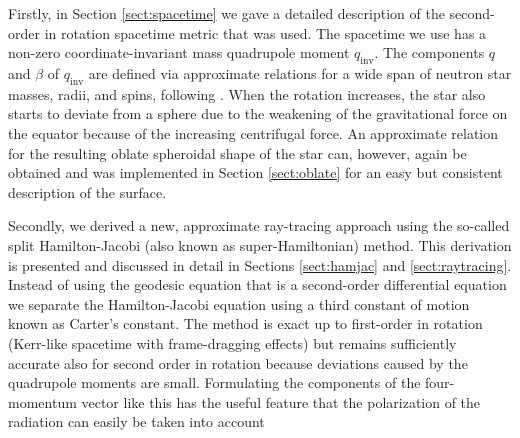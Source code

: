 \documentclass{aa}
\newcommand{\refe}[1]{#1}
\newcommand{\qinv}{\ensuremath{q_{\mathrm{inv}}}}
\begin{document}
Firstly, in Section \ref{sect:spacetime} we gave a detailed description of the second-order in rotation spacetime metric that was used.
The spacetime we use has a non-zero coordinate-invariant mass quadrupole moment $\qinv$. 
\refe{The components $q$ and $\beta$ of $\qinv$ are defined via approximate relations for a wide span of neutron star masses, radii, and spins, following \citet{aGM14}.}
When the rotation increases, the star also starts to deviate from a sphere due to the weakening of the gravitational force on the equator because of the increasing centrifugal force.
An \refe{approximate} relation for the resulting oblate spheroidal shape of the star can, however, again be obtained \citep{MLC07, aGM14} and was implemented in Section \ref{sect:oblate} for an easy but consistent description of the surface.

Secondly, we derived a new, \refe{approximate} ray-tracing \refe{approach} using the so-called split Hamilton-Jacobi (also known as super-Hamiltonian) method.
This derivation is presented and discussed in detail in Sections \ref{sect:hamjac} and \ref{sect:raytracing}.
Instead of using the geodesic equation that is a second-order differential equation we separate the Hamilton-Jacobi equation using a third constant of motion known as Carter's constant.
The method is exact up to first-order in rotation (Kerr-like spacetime with frame-dragging effects) but remains sufficiently accurate also for second order in rotation because deviations caused by the quadrupole moments are small.
Formulating the components of the four-momentum vector like this has the useful feature that the polarization of the radiation can easily be taken into account \citep[see e.g.][]{cha, dexter2016}
\end{document}
